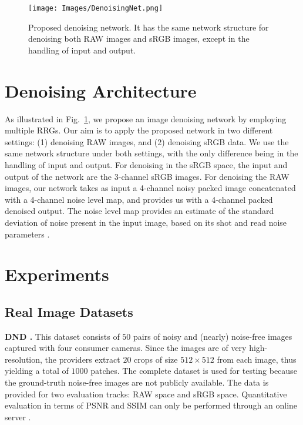 \documentclass[10pt,twocolumn,letterpaper]{article}
\begin{document}
\begin{figure}[t!]
\begin{center}
 \texttt{[image: Images/DenoisingNet.png]}  
\end{center}\vspace{-1.4em}
    \caption{Proposed denoising network. It has the same network structure for denoising both RAW images and sRGB images, except in the handling of input and output.}\vspace{-1.5em}
    \label{Fig:denoising network}
\end{figure}



\section{Denoising Architecture}
As illustrated in Fig.~\ref{Fig:denoising network}, we propose an image denoising network by employing multiple RRGs. 
Our aim is to  apply the proposed network in two different settings: (1) denoising RAW images, and (2) denoising sRGB data. We use the same network structure under both settings, with the only difference being in the handling of input and output. 
For denoising in the sRGB space, the input and output of the network are the 3-channel sRGB images. 
For denoising the RAW images, our network takes as input a 4-channel noisy packed image concatenated with a 4-channel noise level map, and provides us with a 4-channel packed denoised output. 
The noise level map provides an estimate of the standard deviation of noise present in the input image, based on its shot and read noise parameters \cite{Brooks2019}. 




\section{Experiments}


\subsection{Real Image Datasets}
\noindent \textbf{DND \cite{dnd}.} This dataset consists of $50$ pairs of noisy and (nearly) noise-free images captured with four consumer cameras.  
Since the images are of very high-resolution, the providers extract $20$ crops of size $512\times512$ from each image, thus yielding a total of $1000$ patches. 
The complete dataset is used for testing because the ground-truth noise-free images are not publicly available. 
The data is provided for two evaluation tracks: RAW space and sRGB space. 
Quantitative evaluation in terms of PSNR and SSIM can only be performed through an online server \cite{dndwebsite}. 
\end{document}
